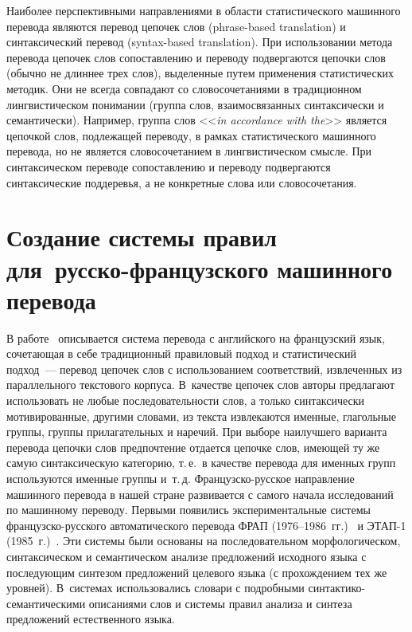 \begin{multicols}{2}
     Наиболее перспективными направлениями в области статистического 
машинного перевода являются перевод цепочек слов (phrase-based translation) 
и синтаксический перевод (syntax-based translation). При использовании 
метода перевода цепочек слов сопоставлению и переводу подвергаются 
цепочки слов (обычно не длиннее трех слов), выделенные путем применения 
статистических методик. Они не всегда совпадают со словосочетаниями в 
традиционном лингвистическом понимании (группа слов, взаимосвязанных 
синтаксически и семантически). Например, группа слов <<\textit{in 
accordance with the}>> является цепочкой слов, подлежащей переводу, в 
рамках статистического машинного перевода, но не является 
словосочетанием в лингвистическом смысле. При синтаксическом переводе 
сопоставлению и переводу подвергаются синтаксические поддеревья, а не 
конкретные слова или словосочетания.
     
\section{Создание системы правил для~русско-французского 
машинного перевода}

     В работе~\cite{12-mor} описывается сис\-те\-ма перевода с английского 
на французский язык, сочетающая в себе традиционный правиловый 
подход и статистический подход~--- перевод цепочек слов с использованием 
соответствий, извлеченных из параллельного текстового корпуса. В~качестве 
цепочек слов авторы предлагают использовать не любые последовательности 
слов, а только синтаксически мотивированные, другими словами, из текста 
извлекаются именные, глагольные группы, группы прилагательных и 
наречий. При выборе наилучшего варианта перевода цепочки слов 
предпочтение отдается цепочке слов, имеющей ту же самую синтаксическую 
категорию, т.\,е.\ в качестве перевода для именных групп используются 
именные группы и~т.\,д. Французско-русское направление машинного 
перевода в нашей стране развивается с самого начала исследований по 
машинному переводу. Первыми появились экспериментальные сис\-те\-мы 
фран\-цуз\-ско-рус\-ско\-го автоматического перевода ФРАП 
     (1976--1986~гг.)~\cite{13-mor} и \mbox{ЭТАП-1} (1985~г.)~\cite{14-mor}. Эти 
сис\-те\-мы были основаны на последовательном морфологическом, 
синтаксическом и семантическом анализе предложений исходного языка с 
последующим синтезом предложений целевого языка (с прохождением тех 
же уровней). В~сис\-те\-мах использовались словари с подробными 
     син\-так\-ти\-ко-се\-ман\-ти\-че\-ски\-ми описаниями слов и сис\-те\-мы 
правил анализа и синтеза предложений естественного языка.
     

\end{multicols}
